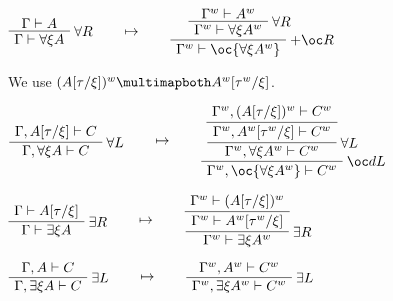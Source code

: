 \(\AxRule{\Gamma\vdash A}
\LabelRule{\forall R}
\UnaRule{\Gamma\vdash \forall\xi A}
\DisplayProof
\qquad\mapsto\qquad
\AxRule{\Gamma^w\vdash A^w}
\LabelRule{\forall R}
\UnaRule{\Gamma^w\vdash \forall\xi A^w}
\LabelRule{+ \oc R}
\UnaRule{\Gamma^w\vdash \oc{\forall\xi A^w}}
\DisplayProof\)

We use \((A[\tau/\xi])^w\linequiv A^w[\tau^w/\xi]\).

\(\AxRule{\Gamma,A[\tau/\xi]\vdash C}
\LabelRule{\forall L}
\UnaRule{\Gamma,\forall\xi A\vdash C}
\DisplayProof
\qquad\mapsto\qquad
\AxRule{\Gamma^w,(A[\tau/\xi])^w\vdash C^w}
\UnaRule{\Gamma^w,A^w[\tau^w/\xi]\vdash C^w}
\LabelRule{\forall L}
\UnaRule{\Gamma^w,\forall\xi A^w\vdash C^w}
\LabelRule{\oc d L}
\UnaRule{\Gamma^w,\oc{\forall\xi A^w}\vdash C^w}
\DisplayProof\)

\(\AxRule{\Gamma\vdash A[\tau/\xi]}
\LabelRule{\exists R}
\UnaRule{\Gamma\vdash \exists\xi A}
\DisplayProof
\qquad\mapsto\qquad
\AxRule{\Gamma^w\vdash (A[\tau/\xi])^w}
\UnaRule{\Gamma^w\vdash A^w[\tau^w/\xi]}
\LabelRule{\exists R}
\UnaRule{\Gamma^w\vdash \exists\xi A^w}
\DisplayProof\)

\(\AxRule{\Gamma,A\vdash C}
\LabelRule{\exists L}
\UnaRule{\Gamma,\exists\xi A\vdash C}
\DisplayProof
\qquad\mapsto\qquad
\AxRule{\Gamma^w,A^w\vdash C^w}
\LabelRule{\exists L}
\UnaRule{\Gamma^w,\exists\xi A^w\vdash C^w}
\DisplayProof\)


